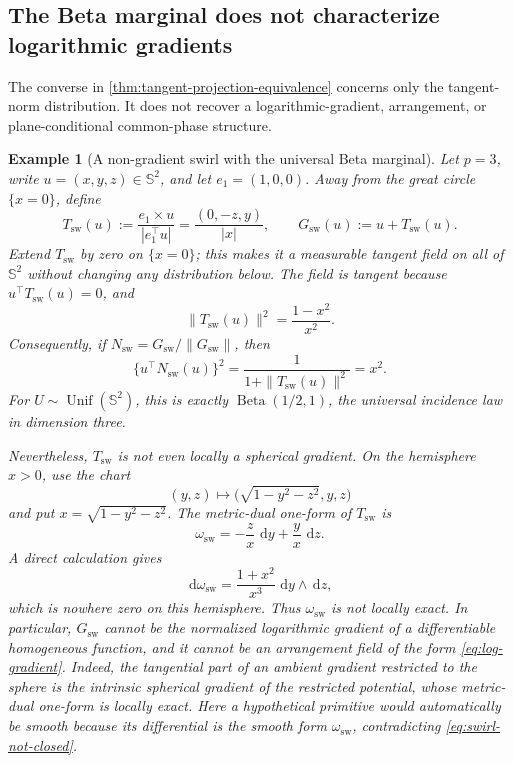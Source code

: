 \documentclass[11pt]{article}
\numberwithin{equation}{section}
\theoremstyle{thmstyleone}%
\theoremstyle{thmstyletwo}%
\newtheorem{example}[example]{Example}
\let\cref\autoref
\newcommand{\sphere}{\mathbb S}
\newcommand{\dd}{\,\mathrm d}
\newcommand{\Beta}{\operatorname{Beta}}
\newcommand{\Unif}{\operatorname{Unif}}
\begin{document}
\subsection{The Beta marginal does not characterize logarithmic gradients}

The converse in \cref{thm:tangent-projection-equivalence} concerns only the
tangent-norm distribution.  It does not recover a logarithmic-gradient,
arrangement, or plane-conditional common-phase structure.

\begin{example}[A non-gradient swirl with the universal Beta marginal]
\label{ex:swirl-counterexample}
Let \(p=3\), write \(u=(x,y,z)\in\sphere^2\), and let \(e_1=(1,0,0)\).
Away from the great circle \(\{x=0\}\), define
\begin{equation}
  T_{\mathrm{sw}}(u)
  :=
  \frac{e_1\times u}{|e_1^\top u|}
  =
  \frac{(0,-z,y)}{|x|},
  \qquad
  G_{\mathrm{sw}}(u):=u+T_{\mathrm{sw}}(u).
  \label{eq:swirl-field}
\end{equation}
Extend \(T_{\mathrm{sw}}\) by zero on \(\{x=0\}\); this makes it a
measurable tangent field on all of \(\sphere^2\) without changing any
distribution below.
The field is tangent because \(u^\top T_{\mathrm{sw}}(u)=0\), and
\[
  \|T_{\mathrm{sw}}(u)\|^2
  =\frac{1-x^2}{x^2}.
\]
Consequently, if
\(N_{\mathrm{sw}}=G_{\mathrm{sw}}/\|G_{\mathrm{sw}}\|\), then
\begin{equation}
  \{u^\top N_{\mathrm{sw}}(u)\}^2
  =
  \frac{1}{1+\|T_{\mathrm{sw}}(u)\|^2}
  =x^2.
  \label{eq:swirl-incidence}
\end{equation}
For \(U\sim\Unif(\sphere^2)\), this is exactly
\(\Beta(1/2,1)\), the universal incidence law in dimension three.

Nevertheless, \(T_{\mathrm{sw}}\) is not even locally a spherical gradient.
On the hemisphere \(x>0\), use the chart
\[
  (y,z)\longmapsto
  \bigl(\sqrt{1-y^2-z^2},y,z\bigr)
\]
and put \(x=\sqrt{1-y^2-z^2}\).  The metric-dual one-form of
\(T_{\mathrm{sw}}\) is
\begin{equation}
  \omega_{\mathrm{sw}}
  =
  -\frac{z}{x}\,\dd y+\frac{y}{x}\,\dd z.
  \label{eq:swirl-one-form}
\end{equation}
A direct calculation gives
\begin{equation}
  \dd\omega_{\mathrm{sw}}
  =
  \frac{1+x^2}{x^3}\,\dd y\wedge\dd z,
  \label{eq:swirl-not-closed}
\end{equation}
which is nowhere zero on this hemisphere.  Thus
\(\omega_{\mathrm{sw}}\) is not locally exact.  In particular,
\(G_{\mathrm{sw}}\) cannot be the normalized logarithmic gradient of a
differentiable homogeneous function, and it cannot be an arrangement field
of the form \cref{eq:log-gradient}.  Indeed, the tangential part of an
ambient gradient restricted to the sphere is the intrinsic spherical
gradient of the restricted potential, whose metric-dual one-form is locally
exact.  Here a hypothetical primitive would automatically be smooth because
its differential is the smooth form \(\omega_{\mathrm{sw}}\), contradicting
\cref{eq:swirl-not-closed}.


\end{example}
\end{document}
